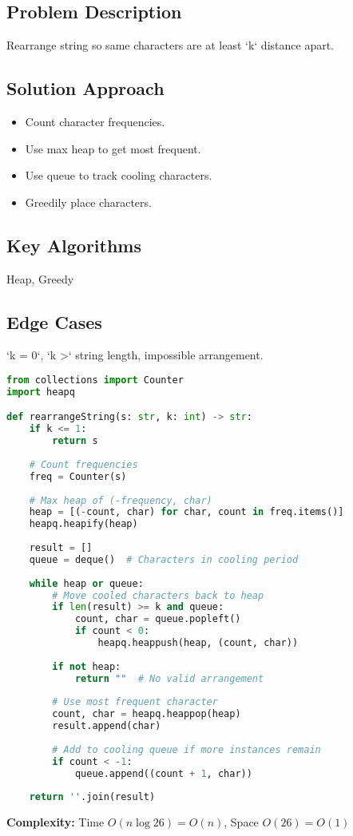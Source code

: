 \documentclass[10pt, a4paper]{article}
\begin{document}
\subsection*{Problem Description}
Rearrange string so same characters are at least `k` distance apart.

\subsection*{Solution Approach}
\begin{itemize}
    \item Count character frequencies.
    \item Use max heap to get most frequent.
    \item Use queue to track cooling characters.
    \item Greedily place characters.
\end{itemize}

\subsection*{Key Algorithms}
Heap, Greedy

\subsection*{Edge Cases}
`k = 0`, `k >` string length, impossible arrangement.

\begin{lstlisting}[language=Python]
from collections import Counter
import heapq

def rearrangeString(s: str, k: int) -> str:
    if k <= 1:
        return s
    
    # Count frequencies
    freq = Counter(s)
    
    # Max heap of (-frequency, char)
    heap = [(-count, char) for char, count in freq.items()]
    heapq.heapify(heap)
    
    result = []
    queue = deque()  # Characters in cooling period
    
    while heap or queue:
        # Move cooled characters back to heap
        if len(result) >= k and queue:
            count, char = queue.popleft()
            if count < 0:
                heapq.heappush(heap, (count, char))
        
        if not heap:
            return ""  # No valid arrangement
        
        # Use most frequent character
        count, char = heapq.heappop(heap)
        result.append(char)
        
        # Add to cooling queue if more instances remain
        if count < -1:
            queue.append((count + 1, char))
    
    return ''.join(result)
\end{lstlisting}
\textbf{Complexity:} Time $O(n \log 26) = O(n)$, Space $O(26) = O(1)$
\end{document}
